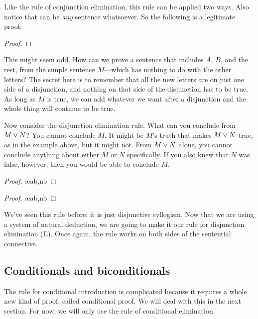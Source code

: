 Like the rule of conjunction elimination, this rule can be applied two ways. Also notice that  can be \emph{any} sentence whatsoever. So the following is a legitimate proof:

\begin{proof}
\end{proof}

This might seem odd. How can we prove a sentence that includes $A$, $B$, and the rest, from the simple sentence $M$---which has nothing to do with the other letters? The secret here is to remember that all the new letters are on just one side of a disjunction, and nothing on that side of the disjunction has to be true. As long as $M$ is true, we can add whatever we want after a disjunction and the whole thing will continue to be true. 

Now consider the disjunction elimination rule. What can you conclude from $M \vee N$? You cannot conclude $M$. It might be $M$'s truth that makes $M \vee N$ true, as in the example above, 
but it might not. From $M \vee N$ alone, you cannot conclude anything about either $M$ or $N$ specifically. If you also knew that $N$ was false, however, then you would be able to 
conclude $M$.

\begin{multicols}{2}
\begin{proof}
	 \oe{ab,nb}
\end{proof}

\begin{proof}
	 \oe{ab,nb}
\end{proof}
\end{multicols}

We've seen this rule before: it is just disjunctive syllogism. Now that we are using a system of natural deduction, we are going to make it our rule for disjunction elimination ({\eor}E). Once again, the rule works on both sides of the sentential connective. 

\subsection{Conditionals and biconditionals}

The rule for conditional introduction is complicated because it requires a whole new kind of proof, called conditional proof. We will deal with this in the next section. For now, we will 
only use the rule of conditional elimination.

